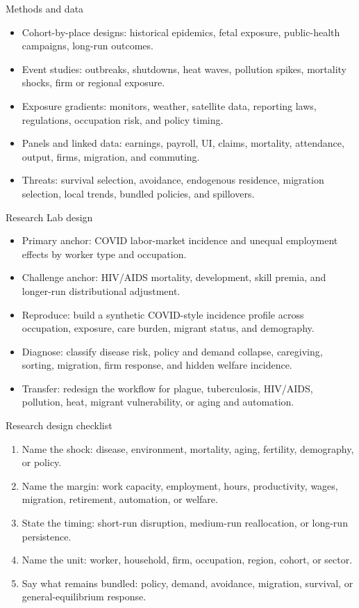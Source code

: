 \documentclass[aspectratio=169,11pt]{beamer}
\begin{document}
\begin{frame}{Methods and data}
\begin{itemize}
    \item Cohort-by-place designs: historical epidemics, fetal exposure, public-health campaigns, long-run outcomes.
    \item Event studies: outbreaks, shutdowns, heat waves, pollution spikes, mortality shocks, firm or regional exposure.
    \item Exposure gradients: monitors, weather, satellite data, reporting laws, regulations, occupation risk, and policy timing.
    \item Panels and linked data: earnings, payroll, UI, claims, mortality, attendance, output, firms, migration, and commuting.
    \item Threats: survival selection, avoidance, endogenous residence, migration selection, local trends, bundled policies, and spillovers.
\end{itemize}
\end{frame}

\begin{frame}{Research Lab design}
\begin{itemize}
    \item Primary anchor: COVID labor-market incidence and unequal employment effects by worker type and occupation.
    \item Challenge anchor: HIV/AIDS mortality, development, skill premia, and longer-run distributional adjustment.
    \item Reproduce: build a synthetic COVID-style incidence profile across occupation, exposure, care burden, migrant status, and demography.
    \item Diagnose: classify disease risk, policy and demand collapse, caregiving, sorting, migration, firm response, and hidden welfare incidence.
    \item Transfer: redesign the workflow for plague, tuberculosis, HIV/AIDS, pollution, heat, migrant vulnerability, or aging and automation.
\end{itemize}
\end{frame}

\begin{frame}{Research design checklist}
\begin{enumerate}
    \item Name the shock: disease, environment, mortality, aging, fertility, demography, or policy.
    \item Name the margin: work capacity, employment, hours, productivity, wages, migration, retirement, automation, or welfare.
    \item State the timing: short-run disruption, medium-run reallocation, or long-run persistence.
    \item Name the unit: worker, household, firm, occupation, region, cohort, or sector.
    \item Say what remains bundled: policy, demand, avoidance, migration, survival, or general-equilibrium response.
\end{enumerate}
\end{frame}
\end{document}
